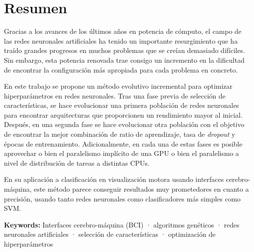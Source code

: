 \begingroup
\let\cleardoublepage\relax
\let\cleardoublepage\relax

\chapter*{Resumen}

Gracias a los avances de los últimos años en potencia de cómputo, el campo de las redes neuronales artificiales ha tenido un importante resurgimiento que ha traído grandes progresos en muchos problemas que se creían demasiado difíciles. Sin embargo, esta potencia renovada trae consigo un incremento en la dificultad de encontrar la configuración más apropiada para cada problema en concreto.

En este trabajo se propone un método evolutivo incremental para optimizar hiperparámetros en redes neuronales. Tras una fase previa de selección de características, se hace evolucionar una primera población de redes neuronales para encontrar arquitecturas que proporcionen un rendimiento mayor al inicial. Después, en una segunda fase se hace evolucionar otra población con el objetivo de encontrar la mejor combinación de ratio de aprendizaje, tasa de \textit{dropout} y épocas de entrenamiento. Adicionalmente, en cada una de estas fases es posible aprovechar o bien el paralelismo implícito de una GPU o bien el paralelismo a nivel de distribución de tareas a distintas CPUs.

En su aplicación a clasificación en visualización motora usando interfaces cerebro-máquina, este método parece conseguir resultados muy prometedores en cuanto a precisión, usando tanto redes neuronales como clasificadores más simples como SVM.

\textbf{Keywords:} Interfaces cerebro-máquina (BCI) · algoritmos genéticos · redes neuronales artificiales · selección de características · optimización de hiperparámetros